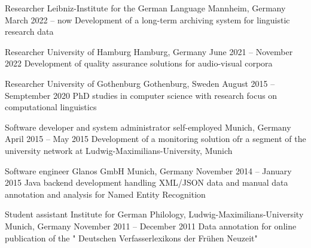 \documentclass[11pt, a4]{academic-cv}
\begin{document}
\begin{cventries}
\cventry
{Researcher} %
{ Leibniz-Institute for the German Language} %
{Mannheim, Germany} %
{March 2022 -- now} %
{
Development of a long-term archiving system for linguistic research data
}

\cventry
{Researcher} %
{ University of Hamburg} %
{Hamburg, Germany} %
{June 2021 -- November 2022} %
{
Development of quality assurance solutions for audio-visual corpora
}

\cventry
{Researcher} %
{ University of Gothenburg} %
{Gothenburg, Sweden} %
{August 2015 -- Semptember 2020} %
{
PhD studies in computer science with research focus on computational linguistics
}

\cventry
{Software developer and system administrator} %
{self-employed} %
{Munich, Germany} %
{April 2015 -- May 2015} %
{
Development of a monitoring solution ofr a segment of the university network at Ludwig-Maximilians-University, Munich
}

\cventry
{Software engineer} %
{ Glanos GmbH} %
{Munich, Germany} %
{November 2014 -- January 2015} %
{
Java backend development handling XML/JSON data and manual data annotation and analysis for Named Entity Recognition
}

\cventry
{Student assistant} %
{ Institute for German Philology, Ludwig-Maximilians-University} %
{Munich, Germany} %
{November 2011 -- December 2011} %
{
Data annotation for online publication of the " Deutschen Verfasserlexikons der Frühen Neuzeit"
}


\end{cventries}
\end{document}
